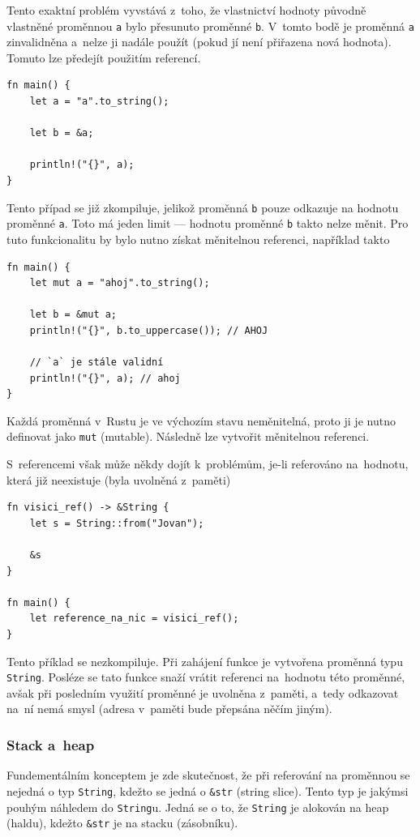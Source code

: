 \documentclass[a4paper, 12pt, twoside]{article} %
\newcommand{\rust}[1]{\texttt{#1}}
\begin{document}
				Tento exaktní problém vyvstává z~toho, že vlastnictví hodnoty původně vlastněné proměnnou \texttt{a} bylo přesunuto proměnné \texttt{b}. V~tomto bodě je proměnná \texttt{a} zinvalidněna a~nelze ji nadále použít (pokud jí není přiřazena nová hodnota). Tomuto lze předejít použitím referencí.
				\begin{verbatim}
fn main() {
	let a = "a".to_string();
	
	let b = &a;
	
	println!("{}", a);
}
				\end{verbatim}
		
				Tento případ se již zkompiluje, jelikož proměnná \texttt{b} pouze odkazuje na hodnotu proměnné \texttt{a}. Toto má jeden limit — hodnotu proměnné \texttt{b} takto nelze měnit. Pro tuto funkcionalitu by bylo nutno získat měnitelnou referenci, například takto
				\begin{verbatim}
fn main() {
	let mut a = "ahoj".to_string();
	
	let b = &mut a;
	println!("{}", b.to_uppercase()); // AHOJ

	// `a` je stále validní
	println!("{}", a); // ahoj
}
				\end{verbatim}
	
				Každá proměnná v~Rustu je ve výchozím stavu neměnitelná, proto ji je nutno definovat jako \texttt{mut} (mutable). Následně lze vytvořit měnitelnou referenci.
				
				S~referencemi však může někdy dojít k~problémům, je-li referováno na~hodnotu, která již neexistuje (byla uvolněná z~paměti)
				\begin{verbatim}
fn visici_ref() -> &String {
	let s = String::from("Jovan");

	&s
}

fn main() {
	let reference_na_nic = visici_ref();
}
				\end{verbatim}
				\cite{dangle}
					
				Tento příklad se nezkompiluje. Při zahájení funkce je vytvořena proměnná typu \rust{String}. Posléze se tato funkce snaží vrátit referenci na~hodnotu této proměnné, avšak při posledním využití proměnné je uvolněna z~paměti, a~tedy odkazovat na~ní nemá smysl (adresa v~paměti bude přepsána něčím jiným).
			
			\subsubsection*{Stack a~heap}
				Fundementálním konceptem je zde skutečnost, že při referování na proměnnou se nejedná o typ \texttt{String}, kdežto se jedná o \texttt{\&str} (string slice). Tento typ je jakýmsi pouhým náhledem do \texttt{String}u. Jedná se o to, že \texttt{String} je alokován na heap (haldu), kdežto \texttt{\&str} je na stacku (zásobníku).
				
\end{document}
